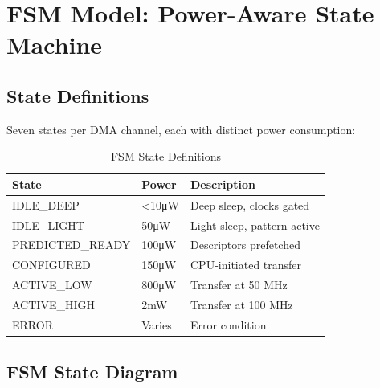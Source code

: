 \documentclass[conference]{IEEEtran}
\begin{document}
\section{FSM Model: Power-Aware State Machine}

\subsection{State Definitions}
Seven states per DMA channel, each with distinct power consumption:

\begin{table}[h]
\centering
\caption{FSM State Definitions}
\label{tab:fsm_states}
\begin{tabular}{lll}
\toprule
\textbf{State} & \textbf{Power} & \textbf{Description} \\
\midrule
IDLE\_DEEP & <10μW & Deep sleep, clocks gated \\
IDLE\_LIGHT & 50μW & Light sleep, pattern active \\
PREDICTED\_READY & 100μW & Descriptors prefetched \\
CONFIGURED & 150μW & CPU-initiated transfer \\
ACTIVE\_LOW & 800μW & Transfer at 50 MHz \\
ACTIVE\_HIGH & 2mW & Transfer at 100 MHz \\
ERROR & Varies & Error condition \\
\bottomrule
\end{tabular}
\end{table}

\subsection{FSM State Diagram}
\end{document}
